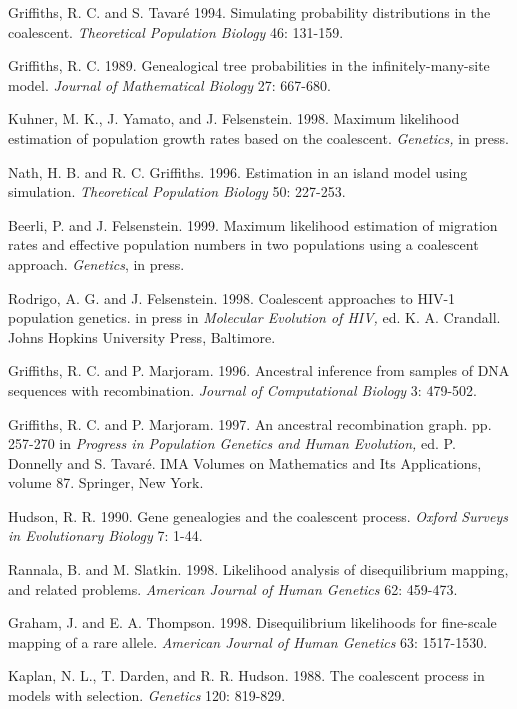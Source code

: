 \begin{thebibliography}{20}
Griffiths, R. C. and S. Tavar\'e  1994.  Simulating probability distributions in the coalescent.
{\it Theoretical Population Biology}  46: 131-159.

Griffiths, R. C.  1989.  Genealogical tree probabilities in the
infinitely-many-site model.  {\it Journal of Mathematical Biology} 27:
667-680.

Kuhner, M. K., J. Yamato, and J. Felsenstein.  1998.  Maximum likelihood
estimation of population growth rates based on the coalescent. {\it Genetics,}
in press.

Nath, H. B. and R. C. Griffiths.  1996.  Estimation in an island model using
simulation.  {\it Theoretical Population Biology}  50: 227-253.

 Beerli, P. and J. Felsenstein. 1999.  Maximum likelihood
estimation of migration rates and effective population numbers in two
populations using a coalescent approach.  {\it Genetics}, in press.

Rodrigo, A. G. and J. Felsenstein. 1998.  Coalescent approaches
to HIV-1 population genetics. in press in {\it Molecular Evolution of HIV,} ed.
K. A. Crandall.  Johns Hopkins University Press, Baltimore.

Griffiths, R. C. and P. Marjoram.  1996.  Ancestral inference from samples of
DNA sequences with recombination.  {\it Journal of Computational Biology}
3: 479-502.

Griffiths, R. C. and P. Marjoram.  1997. An ancestral recombination graph.
pp. 257-270 in {\it Progress in Population Genetics and
Human Evolution,} ed. P. Donnelly and S. Tavar\'e.  IMA Volumes on
Mathematics and Its Applications, volume 87.  Springer, New York.

Hudson, R. R.  1990.  Gene genealogies and the coalescent process.
{\it Oxford Surveys in Evolutionary Biology}  7: 1-44.

Rannala, B. and M. Slatkin.  1998.
Likelihood analysis of disequilibrium mapping, and related
problems.  {\it American Journal of Human Genetics} 62: 459-473.

Graham, J. and E. A. Thompson. 1998.  Disequilibrium likelihoods for fine-scale
mapping of a rare allele.  {\it American Journal of Human Genetics} 63: 1517-1530.

Kaplan, N. L., T. Darden, and R. R. Hudson.  1988.  The coalescent process
in models with selection.  {\it Genetics}  120:  819-829.


\end{thebibliography}
